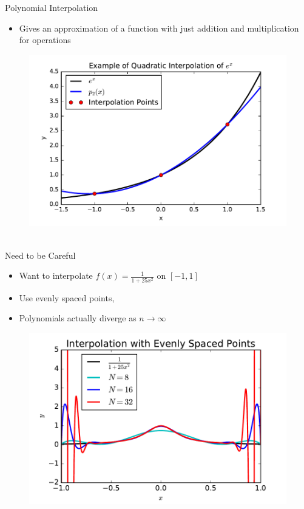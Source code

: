 \documentclass[final]{beamer}
\begin{document}
\begin{frame}[fragile]{}
\begin{columns}[t]
\begin{column}{.31\linewidth}
\begin{block}{Polynomial Interpolation}
\begin{minipage}{.55\linewidth}
\begin{itemize}
		\item Gives an approximation of a function with just addition and multiplication for operations
	\end{itemize}
	\end{minipage}%
	\hfill%
	\begin{minipage}{.4\linewidth}
	\begin{figure}
	\includegraphics[width=\textwidth]{interpolation_ex.pdf}
	\end{figure}
	\end{minipage}%
	\\
	\vspace{2mm}
{\color{numhypRed} Need to be Careful \cite[Thm.\ 6.1]{mason_2003}}\\
	\begin{minipage}{.55\linewidth}
	\begin{itemize}
		\item Want to interpolate $f(x) = \frac{1}{1+25x^2}$ on $[-1,1]$ 
		\item Use evenly spaced points, 
		\item Polynomials actually diverge as $n\to\infty$
	\end{itemize}
	\end{minipage}%
	\hfill%
	\begin{minipage}{.4\linewidth}
	\begin{figure}
	\includegraphics[width=\textwidth]{runge_bad.pdf}

\end{figure}
\end{minipage}
\end{block}
\end{column}
\end{columns}
\end{frame}
\end{document}
